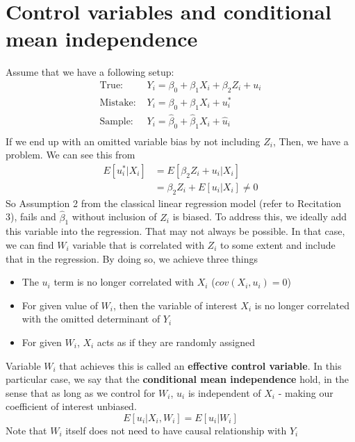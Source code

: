 \section{Control variables and conditional mean independence}
Assume that we have a following setup:
\[
\begin{aligned}
\text{True: }& Y_i = \beta_0 + \beta_1 X_i + \beta_2 Z_i+u_i\\
\text{Mistake: }& Y_i = \beta_0 + \beta_1 X_i + u_i^*\\
\text{Sample: }& Y_i = \hat{\beta}_0 + \hat{\beta}_1 X_i+ \hat{u}_i\\
\end{aligned}
\]
If we end up with an omitted variable bias by not including $Z_i$, Then, we have a problem. We can see this from
\[
\begin{aligned}
E[u_i^*|X_i]&=E[\beta_2Z_i+u_i|X_i]\\
&=\beta_2Z_i+E[u_i|X_i] \neq 0
\end{aligned}
\]
So Assumption 2 from the classical linear regression model (refer to Recitation 3), fails and $\hat{\beta}_1$ without inclusion of $Z_i$ is biased. To address this, we ideally add this variable into the regression. That may not always be possible. In that case, we can find $W_i$ variable that is correlated with $Z_i$ to some extent and include that in the regression. By doing so, we achieve three things
\begin{itemize}
\item The $u_i$ term is no longer correlated with $X_i$ ($cov(X_i, u_i)=0$)
\item For given value of $W_i$, then the variable of interest $X_i$ is no longer correlated with the omitted determinant of $Y_i$
\item For given $W_i$, $X_i$ acts as if they are randomly assigned
\end{itemize}
Variable $W_i$ that achieves this is called an \textbf{effective control variable}. In this particular case, we say that the \textbf{conditional mean independence} hold, in the sense that as long as we control for $W_i$, $u_i$ is independent of $X_i$ - making our coefficient of interest unbiased. 
\[
E[u_i|X_i,W_i]= E[u_i|W_i]
\]
Note that $W_i$ itself does not need to have causal relationship with $Y_i$
